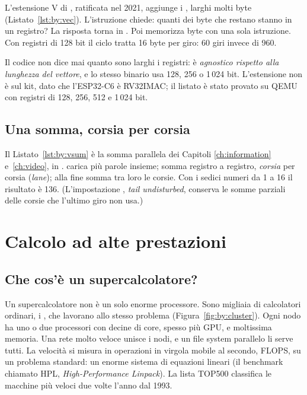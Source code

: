 
L'estensione V di \riscv, ratificata nel 2021, aggiunge i , larghi molti byte (Listato~\ref{lst:by:vec}). L'istruzione
 chiede: quanti dei byte che restano stanno in un registro? La
risposta torna in . Poi  memorizza  byte con una
sola istruzione. Con registri di 128 bit il ciclo tratta 16 byte per giro: 60
giri invece di 960.

Il codice non dice mai quanto sono larghi i registri: è \emph{agnostico
rispetto alla lunghezza del vettore}, e lo stesso binario usa 128, 256 o
1\,024 bit. L'estensione non è sul kit, dato che l'ESP32-C6 è RV32IMAC; il
listato è stato provato su QEMU con registri di 128, 256, 512 e 1\,024 bit.

\subsection{Una somma, corsia per corsia}


Il Listato~\ref{lst:by:vsum} è la somma parallela dei Capitoli
\ref{ch:information} e~\ref{ch:video}, in \riscv.  carica più
parole insieme;  somma registro a registro, \emph{corsia} per
corsia (\emph{lane}); alla fine  somma tra loro le corsie. Con
i sedici numeri da 1 a 16 il risultato è 136. (L'impostazione ,
\emph{tail undisturbed}, conserva le somme parziali delle corsie che l'ultimo
giro non usa.)

\section{Calcolo ad alte prestazioni}

\subsection{Che cos'è un supercalcolatore?}

Un supercalcolatore non è un solo enorme processore. Sono migliaia di
calcolatori ordinari, i , che lavorano allo stesso problema
(Figura~\ref{fig:by:cluster}). Ogni nodo ha uno o due processori con decine di
core, spesso più GPU, e moltissima memoria. Una rete molto veloce unisce i
nodi, e un file system parallelo li serve tutti. La velocità si misura in
operazioni in virgola mobile al secondo, FLOPS, su un problema standard: un
enorme sistema di equazioni lineari (il benchmark chiamato HPL,
\emph{High-Performance Linpack}). La lista TOP500 classifica le macchine più
veloci due volte l'anno dal 1993.

